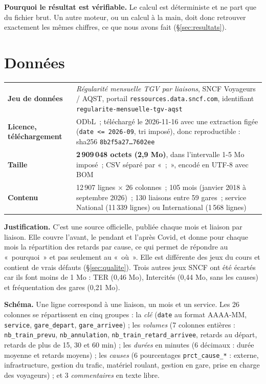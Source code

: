 \documentclass[10pt,a4paper]{article}
\newcommand{\code}[1]{\texttt{\small #1}}
\begin{document}
\textbf{Pourquoi le résultat est vérifiable.} Le calcul est déterministe et ne part que du fichier brut. Un autre moteur, ou un calcul à la main, doit donc retrouver exactement les mêmes chiffres, ce que nous avons fait (§\ref{sec:resultats}).

\section{Données}

\begin{tabularx}{\linewidth}{@{}>{\bfseries}l X@{}}
\toprule
Jeu de données & \emph{Régularité mensuelle TGV par liaisons}, SNCF Voyageurs / AQST, portail \code{ressources.data.sncf.com}, identifiant \code{regularite-mensuelle-tgv-aqst} \\
Licence, téléchargement & ODbL~; téléchargé le 2026-11-16 avec une extraction figée (\code{date <= 2026-09}, tri imposé), donc reproductible : sha256 \code{8b2f5a27\ldots 7602ee} \\
Taille & \textbf{2\,909\,048 octets (2,9 Mo)}, dans l'intervalle 1-5 Mo imposé~; CSV séparé par «~;~», encodé en UTF-8 avec BOM \\
Contenu & 12\,907 lignes $\times$ 26 colonnes~; 105 mois (janvier 2018 à septembre 2026)~; 130 liaisons entre 59 gares~; service National (11\,339 lignes) ou International (1\,568 lignes) \\
\bottomrule
\end{tabularx}

\textbf{Justification.} C'est une source officielle, publiée chaque mois et liaison par liaison. Elle couvre l'avant, le pendant et l'après Covid, et donne pour chaque mois la répartition des retards par cause, ce qui permet de répondre au «~pourquoi~» et pas seulement au «~où~». Elle est différente des jeux du cours et contient de vrais défauts (§\ref{sec:qualite}). Trois autres jeux SNCF ont été écartés car ils font moins de 1 Mo : TER (0,46 Mo), Intercités (0,44 Mo, sans les causes) et fréquentation des gares (0,21 Mo).

\textbf{Schéma.} Une ligne correspond à une liaison, un mois et un service. Les 26 colonnes se répartissent en cinq groupes : la \emph{clé} (\code{date} au format AAAA-MM, \code{service}, \code{gare\_depart}, \code{gare\_arrivee}) ; les \emph{volumes} (7 colonnes entières : \code{nb\_train\_prevu}, \code{nb\_annulation}, \code{nb\_train\_retard\_arrivee}, retards au départ, retards de plus de 15, 30 et 60 min) ; les \emph{durées} en minutes (6 décimaux : durée moyenne et retards moyens) ; les \emph{causes} (6 pourcentages \code{prct\_cause\_*} : externe, infrastructure, gestion du trafic, matériel roulant, gestion en gare, prise en charge des voyageurs) ; et 3 \emph{commentaires} en texte libre.
\end{document}
